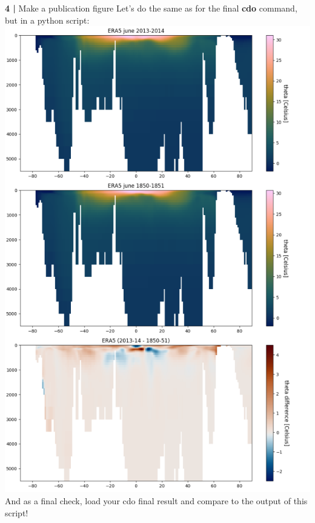 \begin{frame}{\textbf{4 |} Make a publication figure} 
    Let's do the same as for the final \textbf{cdo} command, but in a python script:\\
        \vspace{0.5cm}
    \includegraphics[scale=0.20]{images/ERA5_difference_2013_1850_june.png}\\
    And as a final check, load your cdo final result and compare to the output of this script!
\end{frame}


